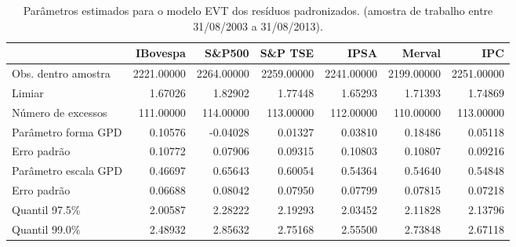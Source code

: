 \begin{table}[H]
\centering
\caption{Parâmetros estimados para o modelo EVT dos resíduos padronizados. 
               (amostra de trabalho entre 31/08/2003 a 31/08/2013).} 
\label{tab:evtcoef}
\begin{tabular}{lrrrrrr}
  \hline
 & IBovespa & S\&P500 & S\&P TSE & IPSA & Merval & IPC \\ 
  \hline
Obs. dentro amostra & 2221.00000 & 2264.00000 & 2259.00000 & 2241.00000 & 2199.00000 & 2251.00000 \\ 
  Limiar & 1.67026 & 1.82902 & 1.77448 & 1.65293 & 1.71393 & 1.74869 \\ 
  Número de excessos & 111.00000 & 114.00000 & 113.00000 & 112.00000 & 110.00000 & 113.00000 \\ 
  Parâmetro forma GPD & 0.10576 & -0.04028 & 0.01327 & 0.03810 & 0.18486 & 0.05118 \\ 
  Erro padrão & 0.10772 & 0.07906 & 0.09315 & 0.10803 & 0.10807 & 0.09216 \\ 
  Parâmetro escala GPD & 0.46697 & 0.65643 & 0.60054 & 0.54364 & 0.54640 & 0.54848 \\ 
  Erro padrão & 0.06688 & 0.08042 & 0.07950 & 0.07799 & 0.07815 & 0.07218 \\ 
  Quantil 97.5\% & 2.00587 & 2.28222 & 2.19293 & 2.03452 & 2.11828 & 2.13796 \\ 
  Quantil 99.0\% & 2.48932 & 2.85632 & 2.75168 & 2.55500 & 2.73848 & 2.67118 \\ 
   \hline
\end{tabular}
\end{table}
